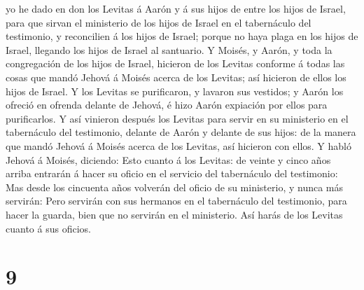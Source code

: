 yo he dado en don los Levitas á Aarón y á sus hijos de entre los hijos
de Israel, para que sirvan el ministerio de los hijos de Israel en el
tabernáculo del testimonio, y reconcilien á los hijos de Israel; porque
no haya plaga en los hijos de Israel, llegando los hijos de Israel al
santuario.  Y Moisés, y Aarón, y toda la congregación de
los hijos de Israel, hicieron de los Levitas conforme á todas las cosas
que mandó Jehová á Moisés acerca de los Levitas; así hicieron de ellos
los hijos de Israel.  Y los Levitas se purificaron, y
lavaron sus vestidos; y Aarón los ofreció en ofrenda delante de Jehová,
é hizo Aarón expiación por ellos para purificarlos.  Y así
vinieron después los Levitas para servir en su ministerio en el
tabernáculo del testimonio, delante de Aarón y delante de sus hijos: de
la manera que mandó Jehová á Moisés acerca de los Levitas, así hicieron
con ellos.  Y habló Jehová á Moisés, diciendo:
 Esto cuanto á los Levitas: de veinte y cinco años arriba
entrarán á hacer su oficio en el servicio del tabernáculo del
testimonio:  Mas desde los cincuenta años volverán del
oficio de su ministerio, y nunca más servirán:  Pero
servirán con sus hermanos en el tabernáculo del testimonio, para hacer
la guarda, bien que no servirán en el ministerio. Así harás de los
Levitas cuanto á sus oficios.

\hypertarget{section-8}{%
\section{9}\label{section-8}}

